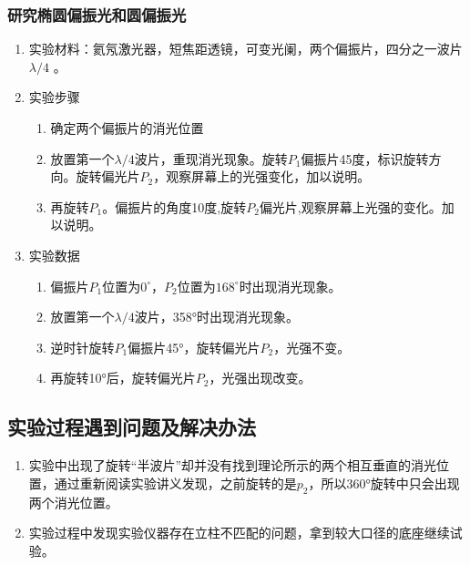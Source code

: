 \documentclass[dvipsnames, svgnames,a4paper,11pt]{article}
\begin{document}
\subsubsection{研究椭圆偏振光和圆偏振光}
\begin{enumerate}
	
	\item 实验材料：氦氖激光器，短焦距透镜，可变光阑，两个偏振片，四分之一波片$\lambda/4$ 。
	\item 实验步骤
   \begin{enumerate}
		\item  确定两个偏振片的消光位置
		\item 放置第一个$\lambda/4$波片，重现消光现象。旋转$P_1$偏振片45度，标识旋转方向。旋转偏光片$P_2$，观察屏幕上的光强变化，加以说明。

		\item  再旋转$P_1$。偏振片的角度10度,旋转$P_2$偏光片,观察屏幕上光强的变化。加以说明。
		
		
	\end{enumerate}
\item 实验数据
\begin{enumerate}
	\item 偏振片$P_1$位置为$0^\circ$，$P_2$位置为$168^\circ$时出现消光现象。
	\item 放置第一个$\lambda/4$波片，358°时出现消光现象。
	\item 逆时针旋转$P_1$偏振片45°，旋转偏光片$P_2$，光强不变。
	\item 再旋转10°后，旋转偏光片$P_2$，光强出现改变。
\end{enumerate}


\end{enumerate}


	
	
	
	\subsection{实验过程遇到问题及解决办法}
	\begin{enumerate}
		\item 实验中出现了旋转“半波片”却并没有找到理论所示的两个相互垂直的消光位置，通过重新阅读实验讲义发现，之前旋转的是$p_2$，所以360°旋转中只会出现两个消光位置。
		\item 实验过程中发现实验仪器存在立柱不匹配的问题，拿到较大口径的底座继续试验。
	\end{enumerate}
	
	
	
\end{document}
